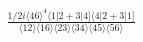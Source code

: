 \documentclass[varwidth, border=5pt]{standalone}
\begin{document}
\begin{my}
$\begin{gathered}
\scriptscriptstyle\frac{1/2i\langle46\rangle^4\langle1|2+3|4]\langle4|2+3|1]}{\langle12\rangle\langle16\rangle\langle23\rangle\langle34\rangle\langle45\rangle\langle56\rangle}
\end{gathered}$
\end{my}
\end{document}
